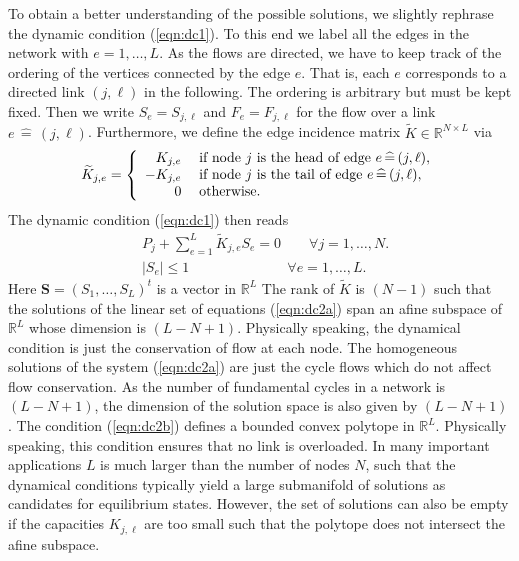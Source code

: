 \documentclass[10pt,aps,pra,onecolumn,superscriptaddress]{revtex4-1}
\newcommand{\be}{\begin{equation}}
\newcommand{\ee}{\end{equation}}
\renewcommand{\vec}[1]{\boldsymbol{#1}}
\begin{document}
To obtain a better understanding of the possible solutions,
we slightly rephrase the dynamic condition  (\ref{eqn:dc1}).
To this end we label all the edges in the network with $e = 1,\ldots,L$.
As the flows are directed, we have to keep track of the ordering
of the vertices connected by the edge $e$. That is, each $e$ 
corresponds to a directed link $(j,\ell)$ in the following. The ordering
is arbitrary but must be kept fixed.
Then we write $S_e = S_{j,\ell}$ and $F_e = F_{j,\ell}$
for the flow over a link $e  \,  \widehat= \, (j,\ell)$. 
Furthermore, we define the edge incidence matrix
$\widetilde K \in \mathbb{R}^{N\times L}$ via
\be
   \widetilde K _{j,e} = \left\{
   \begin{array}{r l }
      K_{j,e} & \; \mbox{if node $j$ is the head of edge $e  \,  \widehat= \, (j,\ell)$},  \\
      - K_{j,e} & \; \mbox{if node $j$ is the tail of edge $e  \,  \widehat= \, (j,\ell)$},  \\
      0     & \; \mbox{otherwise}.
  \end{array} \right.
\ee
The dynamic condition (\ref{eqn:dc1}) then reads
\begin{subequations}
\label{eqn:dc2}
\begin{align}
   & P_j + \sum_{e=1}^L \widetilde K _{j,e} S_e = 0 \qquad 
              \forall j=1,\ldots,N. 
     \label{eqn:dc2a}  \\
  &  |S_{e}|   \le 1 \quad \qquad \qquad \qquad  
              \forall e = 1,\ldots,L.
  \label{eqn:dc2b}
\end{align} 
\end{subequations}
Here $\vec S = (S_1,\ldots,S_L)^t$ is a vector in $\mathbb{R}^L$
The rank of $\widetilde K$ is $(N-1)$ such that the solutions 
of the linear set of equations (\ref{eqn:dc2a}) span an afine 
subspace of $\mathbb{R}^L$ whose dimension  is $(L-N+1)$. 
Physically speaking, the dynamical condition is just the
conservation of flow at each node. The homogeneous 
solutions of the system (\ref{eqn:dc2a}) are just the cycle
flows which do not affect flow conservation. As the number
of fundamental cycles in a network is  $(L-N+1)$, the dimension
of the solution space is also given by $(L-N+1)$.
The condition (\ref{eqn:dc2b}) defines a bounded convex 
polytope in $\mathbb{R}^L$. Physically speaking, this condition
ensures that no link is overloaded. 
In many important applications $L$ is much larger than 
the number of nodes $N$, such that the dynamical
conditions typically yield a large submanifold of solutions
as candidates for equilibrium states. However, the set of
solutions can also be empty if the capacities $K_{j,\ell}$
are too small such that the polytope does not intersect
the afine subspace.
  
\end{document}
